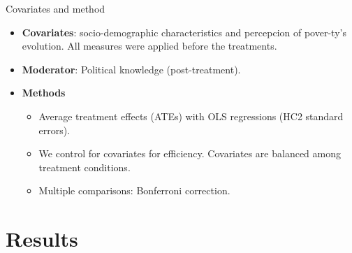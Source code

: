 \documentclass{beamer}
\begin{document}
\begin{frame}{Covariates and method}

\begin{itemize}
\justifying
\item \textbf{Covariates}: socio-demographic characteristics and percepcion of pover-ty's evolution. All measures were applied before the treatments.
\medskip
\medskip
\item \textbf{Moderator}: Political knowledge (post-treatment).
\medskip
\medskip
\item \textbf{Methods}
	\begin{itemize}
	\justifying
	\item Average treatment effects (ATEs) with OLS regressions (HC2 standard errors).
	\item We control for covariates for efficiency. Covariates are balanced among treatment conditions.
	\item Multiple comparisons: Bonferroni correction.
	\end{itemize}
\end{itemize}
\end{frame}		


\section{Results}
\end{document}

